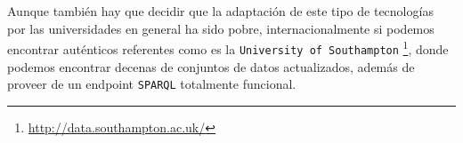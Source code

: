 \bigskip
Aunque también hay que decidir que la adaptación de este tipo de tecnologías por las universidades en general ha sido pobre, internacionalmente si podemos encontrar auténticos referentes como es la {\tt University of Southampton} \footnote{\url{http://data.southampton.ac.uk/}}, donde podemos encontrar decenas de conjuntos de datos actualizados, además de proveer de un endpoint {\tt SPARQL} totalmente funcional.